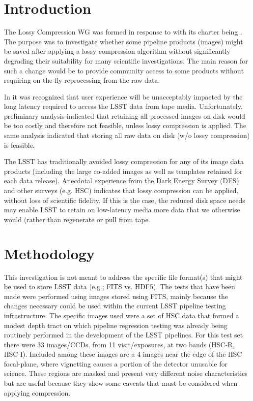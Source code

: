
\section{Introduction}

The Lossy Compression WG was formed in response to  with its charter
being .  The purpose was to investigate whether some pipeline products
(images) might be saved after applying a lossy compression algorithm without significantly
degrading their suitability for many scientific investigations.  The main reason 
for such a change would be to provide community access to some products without 
requiring on-the-fly reprocessing from the raw data.

In  it was recognized that user 
experience will be unacceptably impacted by the long latency required to 
access the LSST data from tape media. Unfortunately, preliminary analysis
indicated that retaining all processed images on disk would be too costly 
and therefore not feasible, unless lossy compression is applied. The same
analysis indicated that storing all raw data on disk (w/o lossy compression)
is feasible.

The LSST has traditionally avoided lossy compression for any of its image 
data products (including the large co-added images as well as templates 
retained for each data release). Anecdotal experience from the Dark Energy 
Survey (DES) and other surveys (e.g. HSC) indicates that lossy compression 
can be applied, without loss of scientific fidelity.  If this is the case, 
the reduced disk space needs may enable LSST to retain on low-latency media 
more data that we otherwise would (rather than regenerate or pull from tape. 


\section{Methodology}

This investigation is not meant to address the specific file format(s) that might be
used to store LSST data (e.g.; FITS vs. HDF5).  The tests that have been made were performed
using images stored using FITS, mainly because the changes necessary could be used within 
the current LSST pipeline testing infrastructure.  The specific images used were a set of
HSC data that formed a modest depth tract on which pipeline regression testing was already
being routinely performed in the development of the LSST pipelines.  For this test set there
were 33 images/CCDs, from 11 visit/exposures, at two bands (HSC-R, HSC-I).  Included among
these images are a 4 images near the edge of the HSC focal-plane, where vignetting causes
a portion of the detector unusable for science.  These regions are masked and present very 
different noise characteristics but are useful because they show some caveats that must be
considered when applying compression.

